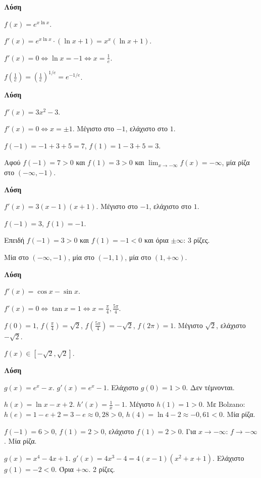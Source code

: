 \documentclass[11pt,a4paper,modern]{FFExercises}
\begin{document}
\askhsh %
\textbf{Λύση}
\begin{alist}
    \item $f(x) = e^{x \ln x}$.
    \item $f'(x) = e^{x \ln x} \cdot (\ln x + 1) = x^x(\ln x + 1)$.
    \item $f'(x) = 0 \Leftrightarrow \ln x = -1 \Leftrightarrow x = \frac{1}{e}$.
    \item $f\left(\frac{1}{e}\right) = \left(\frac{1}{e}\right)^{1/e} = e^{-1/e}$.
\end{alist}

\askhsh %
\textbf{Λύση}
\begin{alist}
    \item $f'(x) = 3x^2 - 3$.
    \item $f'(x) = 0 \Leftrightarrow x = \pm 1$. Μέγιστο στο $-1$, ελάχιστο στο $1$.
    \item $f(-1) = -1 + 3 + 5 = 7$, $f(1) = 1 - 3 + 5 = 3$.
    \item Αφού $f(-1) = 7 > 0$ και $f(1) = 3 > 0$ και $\lim_{x \to -\infty} f(x) = -\infty$, μία ρίζα στο $(-\infty, -1)$.
\end{alist}

\askhsh %
\textbf{Λύση}
\begin{alist}
    \item $f'(x) = 3(x-1)(x+1)$. Μέγιστο στο $-1$, ελάχιστο στο $1$.
    \item $f(-1) = 3$, $f(1) = -1$.
    \item Επειδή $f(-1) = 3 > 0$ και $f(1) = -1 < 0$ και όρια $\pm\infty$: 3 ρίζες.
    \item Μία στο $(-\infty, -1)$, μία στο $(-1, 1)$, μία στο $(1, +\infty)$.
\end{alist}

\askhsh %
\textbf{Λύση}
\begin{alist}
    \item $f'(x) = \cos x - \sin x$.
    \item $f'(x) = 0 \Leftrightarrow \tan x = 1 \Leftrightarrow x = \frac{\pi}{4}, \frac{5\pi}{4}$.
    \item $f(0) = 1$, $f(\frac{\pi}{4}) = \sqrt{2}$, $f(\frac{5\pi}{4}) = -\sqrt{2}$, $f(2\pi) = 1$. Μέγιστο $\sqrt{2}$, ελάχιστο $-\sqrt{2}$.
    \item $f(x) \in [-\sqrt{2}, \sqrt{2}]$.
\end{alist}

\askhsh %
\textbf{Λύση}
\begin{alist}
    \item $g(x) = e^x - x$. $g'(x) = e^x - 1$. Ελάχιστο $g(0) = 1 > 0$. Δεν τέμνονται.
    \item $h(x) = \ln x - x + 2$. $h'(x) = \frac{1}{x} - 1$. Μέγιστο $h(1) = 1 > 0$. Με Bolzano: $h(e) = 1 - e + 2 = 3 - e \approx 0{,}28 > 0$, $h(4) = \ln 4 - 2 \approx -0{,}61 < 0$. Μία ρίζα.
    \item $f(-1) = 6 > 0$, $f(1) = 2 > 0$, ελάχιστο $f(1) = 2 > 0$. Για $x \to -\infty$: $f \to -\infty$. Μία ρίζα.
    \item $g(x) = x^4 - 4x + 1$. $g'(x) = 4x^3 - 4 = 4(x-1)(x^2+x+1)$. Ελάχιστο $g(1) = -2 < 0$. Όρια $+\infty$. 2 ρίζες.
\end{alist}
\end{document}
